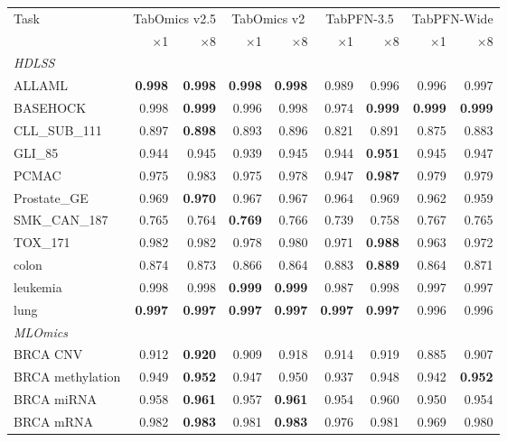 \begin{tabular}{lrrrrrrrr}
\toprule
Task & \multicolumn{2}{c}{TabOmics v2.5} & \multicolumn{2}{c}{TabOmics v2} & \multicolumn{2}{c}{TabPFN-3.5} & \multicolumn{2}{c}{TabPFN-Wide} \\
\cmidrule(lr){2-3} \cmidrule(lr){4-5} \cmidrule(lr){6-7} \cmidrule(lr){8-9}
 & $\times$1 & $\times$8 & $\times$1 & $\times$8 & $\times$1 & $\times$8 & $\times$1 & $\times$8 \\
\midrule \multicolumn{9}{l}{\emph{HDLSS}} \\
ALLAML & \textbf{0.998} & \textbf{0.998} & \textbf{0.998} & \textbf{0.998} & 0.989 & 0.996 & 0.996 & 0.997 \\
BASEHOCK & 0.998 & \textbf{0.999} & 0.996 & 0.998 & 0.974 & \textbf{0.999} & \textbf{0.999} & \textbf{0.999} \\
CLL\_SUB\_111 & 0.897 & \textbf{0.898} & 0.893 & 0.896 & 0.821 & 0.891 & 0.875 & 0.883 \\
GLI\_85 & 0.944 & 0.945 & 0.939 & 0.945 & 0.944 & \textbf{0.951} & 0.945 & 0.947 \\
PCMAC & 0.975 & 0.983 & 0.975 & 0.978 & 0.947 & \textbf{0.987} & 0.979 & 0.979 \\
Prostate\_GE & 0.969 & \textbf{0.970} & 0.967 & 0.967 & 0.964 & 0.969 & 0.962 & 0.959 \\
SMK\_CAN\_187 & 0.765 & 0.764 & \textbf{0.769} & 0.766 & 0.739 & 0.758 & 0.767 & 0.765 \\
TOX\_171 & 0.982 & 0.982 & 0.978 & 0.980 & 0.971 & \textbf{0.988} & 0.963 & 0.972 \\
colon & 0.874 & 0.873 & 0.866 & 0.864 & 0.883 & \textbf{0.889} & 0.864 & 0.871 \\
leukemia & 0.998 & 0.998 & \textbf{0.999} & \textbf{0.999} & 0.987 & 0.998 & 0.997 & 0.997 \\
lung & \textbf{0.997} & \textbf{0.997} & \textbf{0.997} & \textbf{0.997} & \textbf{0.997} & \textbf{0.997} & 0.996 & 0.996 \\
\midrule \multicolumn{9}{l}{\emph{MLOmics}} \\
BRCA CNV & 0.912 & \textbf{0.920} & 0.909 & 0.918 & 0.914 & 0.919 & 0.885 & 0.907 \\
BRCA methylation & 0.949 & \textbf{0.952} & 0.947 & 0.950 & 0.937 & 0.948 & 0.942 & \textbf{0.952} \\
BRCA miRNA & 0.958 & \textbf{0.961} & 0.957 & \textbf{0.961} & 0.954 & 0.960 & 0.950 & 0.954 \\
BRCA mRNA & 0.982 & \textbf{0.983} & 0.981 & \textbf{0.983} & 0.976 & 0.981 & 0.969 & 0.980 \\

\end{tabular}
